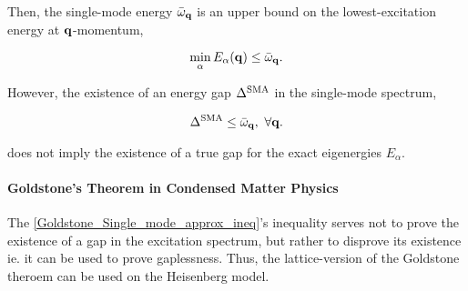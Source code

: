 \documentclass{homework}
\begin{document}
Then, the single-mode energy $\bar{\omega}_{{\bf q}}$ is an upper bound on the lowest-excitation energy at ${\bf q}$-momentum,

\begin{equation}
    \min_{\alpha} E_{\alpha}({\bf q}) \leq \bar{\omega}_{{\bf q}}.
    \label{Goldstone_Single_mode_approx_ineq}
\end{equation}

However, the existence of an energy gap $\Delta^{\textnormal{SMA}}$ in the single-mode spectrum,

\begin{equation}
    \Delta^{\textnormal{SMA}} \leq  \bar{\omega}_{{\bf q}}, \textnormal{ } \forall {\bf q}.
\end{equation}

does not imply the existence of a true gap for the exact eigenergies $E_{\alpha}$. \\

\paragraph{\textbf{Goldstone's Theorem in Condensed Matter Physics}}

The \cref{Goldstone_Single_mode_approx_ineq}'s inequality serves not to prove the existence of a gap in the excitation spectrum, but rather to disprove its existence ie. it can be used to prove gaplessness. Thus, the lattice-version of the Goldstone theroem can be used on the Heisenberg model. \\
\end{document}
